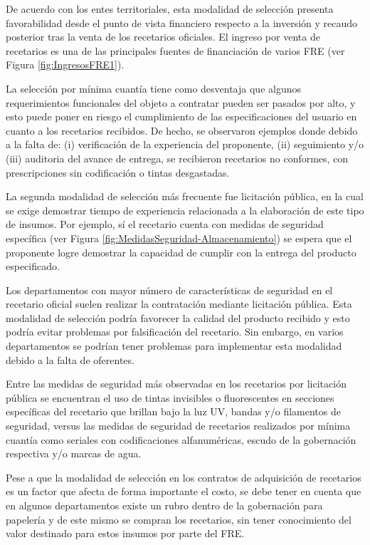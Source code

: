 \documentclass[
]{book}
\begin{document}
De acuerdo con los entes territoriales, esta modalidad de selección presenta favorabilidad desde el punto de vista financiero respecto a la inversión y recaudo posterior tras la venta de los recetarios oficiales. El ingreso por venta de recetarios es una de las principales fuentes de financiación de varios FRE (ver Figura \ref{fig:IngresosFRE1}).

La selección por mínima cuantía tiene como desventaja que algunos requerimientos funcionales del objeto a contratar pueden ser pasados por alto, y esto puede poner en riesgo el cumplimiento de las especificaciones del usuario en cuanto a los recetarios recibidos. De hecho, se observaron ejemplos donde debido a la falta de: (i) verificación de la experiencia del proponente, (ii) seguimiento y/o (iii) auditoria del avance de entrega, se recibieron recetarios no conformes, con prescripciones sin codificación o tintas desgastadas.

La segunda modalidad de selección más frecuente fue licitación pública, en la cual se exige demostrar tiempo de experiencia relacionada a la elaboración de este tipo de insumos. Por ejemplo, sí el recetario cuenta con medidas de seguridad específica (ver Figura \ref{fig:MedidasSeguridad-Almacenamiento}) se espera que el proponente logre demostrar la capacidad de cumplir con la entrega del producto especificado.

Los departamentos con mayor número de características de seguridad en el recetario oficial suelen realizar la contratación mediante licitación pública. Esta modalidad de selección podría favorecer la calidad del producto recibido y esto podría evitar problemas por falsificación del recetario. Sin embargo, en varios departamentos se podrían tener problemas para implementar esta modalidad debido a la falta de oferentes.

Entre las medidas de seguridad más observadas en los recetarios por licitación pública se encuentran el uso de tintas invisibles o fluorescentes en secciones específicas del recetario que brillan bajo la luz UV, bandas y/o filamentos de seguridad, versus las medidas de seguridad de recetarios realizados por mínima cuantía como seriales con codificaciones alfanuméricas, escudo de la gobernación respectiva y/o marcas de agua.

Pese a que la modalidad de selección en los contratos de adquisición de recetarios es un factor que afecta de forma importante el costo, se debe tener en cuenta que en algunos departamentos existe un rubro dentro de la gobernación para papelería y de este mismo se compran los recetarios, sin tener conocimiento del valor destinado para estos insumos por parte del FRE.
\end{document}
